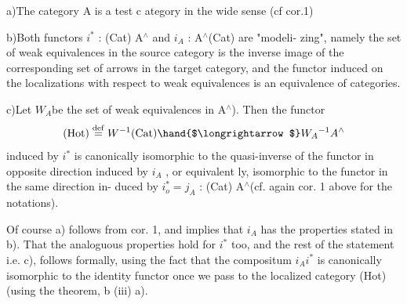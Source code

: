 
a)\quad The category A is a test c ategory in the wide sense (cf cor.1)

b)\quad Both functors $i^*$ : (Cat)\hand{$\longrightarrow$} A$^\wedge$ and $i_A$ : A$^\wedge$\hand{$\longrightarrow$}(Cat) are "modeli-%
zing", namely the set of weak equivalences in the source category
is the inverse image of the corresponding set of arrows in the
target category, and the functor induced on the localizations
with respect to weak equivalences is an equivalence of categories.

c)\quad Let \hand{(}$W_A$\hand{)}be the set of weak equivalences in A$^\wedge$). Then the functor
\[ (\mathrm{Hot}) \overset{\mathrm{def}}{=} W^{-1}(\mathrm{Cat}) \hand{$\longrightarrow$} W_A{}^{-1}A^\wedge \]
induced by $i^*$ is canonically isomorphic to the quasi-inverse
of the functor in opposite direction induced by $i_A$ , or equivalent%
ly,  isomorphic to the functor in the same direction in-%
duced by $i_o^* = j_A$ : (Cat)\hand{$\longrightarrow$} A$^\wedge$(cf. again cor. 1 above for 
the notations).

Of course a) follows from cor. 1, and implies that $i_A$ has the
properties stated in b). That the analoguous properties hold for $i^*$ too,
and the rest of the statement i.e. c), follows formally, using the fact
that the compositum $i_Ai^*$ is canonically isomorphic to the identity functor
once we pass to the localized category (Hot) (using the theorem,
b (iii) \hand{$\Rightarrow$} a)\hand{)}.

